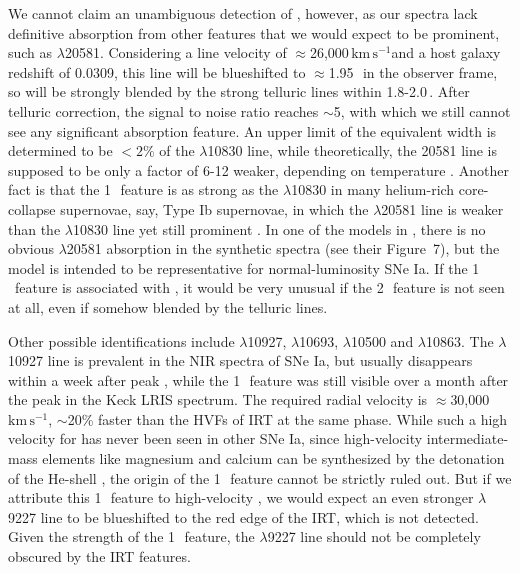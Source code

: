 \documentclass[twocolumn]{aastex631}
\newcommand{\kms}{$\mathrm{km}\,\mathrm{s}^{-1}$}
\begin{document}
We cannot claim an unambiguous detection of , however, as our spectra lack definitive absorption from other  features that we would expect to be prominent, such as  $\lambda$20581. Considering a line velocity of $\approx$26,000\,\kms and a host galaxy redshift of 0.0309, this line will be blueshifted to $\approx$1.95\,\micron\ in the observer frame, so will be strongly blended by the strong telluric lines within 1.8-2.0\,\micron. After telluric correction, the signal to noise ratio reaches $\sim$5, with which we still cannot see any significant absorption feature. An upper limit of the equivalent width is determined to be $<$$2\%$ of the  $\lambda$10830 line, while theoretically, the 20581 line is supposed to be only a factor of 6-12 weaker, depending on temperature \citep{Marion2009_NIR}. Another fact is that the 1\,\micron\ feature is as strong as the  $\lambda$10830 in many helium-rich core-collapse supernovae, say, Type Ib supernovae, in which the  $\lambda$20581 line is weaker than the  $\lambda$10830 line yet still prominent \citep{CSP_Ibc_2022}. In one of the models in \citet{Boyle2017_Helium}, there is no obvious  $\lambda$20581 absorption in the synthetic spectra (see their Figure~7), but the model is intended to be representative for normal-luminosity SNe Ia. If the 1\,\micron\ feature is associated with , it would be very unusual if the 2\,\micron\ feature is not seen at all, even if somehow blended by the telluric lines.

Other possible identifications include  $\lambda$10927,  $\lambda$10693,  $\lambda$10500 and $\lambda$10863. The  $\lambda$10927 line is prevalent in the NIR spectra of SNe Ia, but usually disappears within a week after peak \citep{Marion2009_NIR}, while the 1\,\micron\ feature was still visible over a month after the peak in the Keck LRIS spectrum. The required radial velocity is $\approx$30,000\,\kms, $\sim$20\% faster than the HVFs of  IRT at the same phase. While such a high velocity for  has never been seen in other SNe Ia, since high-velocity intermediate-mass elements like magnesium and calcium can be synthesized by the detonation of the He-shell \citep{Shen_DD_2014}, the  origin of the 1\,\micron\ feature cannot be strictly ruled out. But if we attribute this 1\,\micron\ feature to high-velocity , we would expect an even stronger  $\lambda$9227 line to be blueshifted to the red edge of the  IRT, which is not detected. Given the strength of the 1\,\micron\ feature, the  $\lambda$9227 line should not be completely obscured by the  IRT features. 
\end{document}
